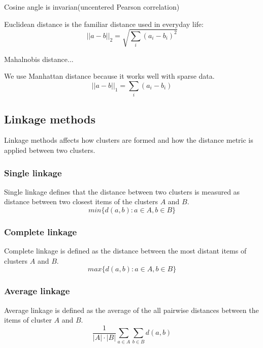 Cosine angle is invarian(uncentered Pearson 
correlation)

Euclidean distance is the familiar distance used in everyday life:
\begin{equation}
 ||a-b||_2 = \sqrt{\sum_i{(a_i-b_i)^2}}
\end{equation}

Mahalnobis distance...

We use Manhattan distance because it works well with sparse data.
\cite{ref_here}
\begin{equation}
 ||a-b||_1 = \sum_i{(a_i-b_i)}
\end{equation}


\subsection{Linkage methods}
Linkage methods affects how clusters are formed and how the 
distance metric is applied between two clusters.

\subsubsection{Single linkage}
Single linkage defines that the distance between two clusters is 
measured as distance between two closest items of the clusters 
$A$ and $B$.
\begin{equation}
 min\{d(a,b):a \in A, b \in B\}
\end{equation}

\subsubsection{Complete linkage}
Complete linkage is defined as the distance between the most 
distant items of clusters $A$ and $B$.
\begin{equation}
 max\{d(a,b):a \in A, b \in B\}
\end{equation}

\subsubsection{Average linkage}
Average linkage is defined as the average of the all pairwise 
distances between the items of cluster $A$ and $B$.
\begin{equation}
 \frac{1}{|A| \cdot |B|} \sum_{a \in A} \sum_{b \in B}d(a,b)
\end{equation}

